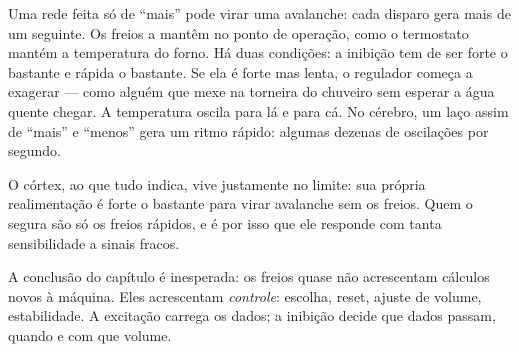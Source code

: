 Uma rede feita só de ``mais'' pode virar uma avalanche: cada disparo gera mais de um seguinte. Os freios a mantêm no ponto de operação, como o termostato mantém a temperatura do forno. Há duas condições: a inibição tem de ser forte o bastante e rápida o bastante. Se ela é forte mas lenta, o regulador começa a exagerar --- como alguém que mexe na torneira do chuveiro sem esperar a água quente chegar. A temperatura oscila para lá e para cá. No cérebro, um laço assim de ``mais'' e ``menos'' gera um ritmo rápido: algumas dezenas de oscilações por segundo.

O córtex, ao que tudo indica, vive justamente no limite: sua própria realimentação é forte o bastante para virar avalanche sem os freios. Quem o segura são só os freios rápidos, e é por isso que ele responde com tanta sensibilidade a sinais fracos.

A conclusão do capítulo é inesperada: os freios quase não acrescentam cálculos novos à máquina. Eles acrescentam \emph{controle}: escolha, reset, ajuste de volume, estabilidade. A excitação carrega os dados; a inibição decide que dados passam, quando e com que volume.


